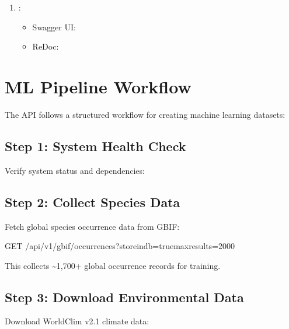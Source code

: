 \documentclass[letterpaper,10pt,english]{sphinxmanual}
\begin{document}
\begin{enumerate}
\item {} 
\sphinxAtStartPar
{}:
\begin{itemize}
\item {} 
\sphinxAtStartPar
Swagger UI: 

\item {} 
\sphinxAtStartPar
ReDoc: 

\end{itemize}

\end{enumerate}


\section{ML Pipeline Workflow}
\label{\detokenize{user_guide:ml-pipeline-workflow}}
\sphinxAtStartPar
The API follows a structured workflow for creating machine learning datasets:


\subsection{Step 1: System Health Check}
\label{\detokenize{user_guide:step-1-system-health-check}}
\sphinxAtStartPar
Verify system status and dependencies:

\begin{sphinxVerbatim}[commandchars=\\\{\}]
 
\end{sphinxVerbatim}


\subsection{Step 2: Collect Species Data}
\label{\detokenize{user_guide:step-2-collect-species-data}}
\sphinxAtStartPar
Fetch global species occurrence data from GBIF:

\begin{sphinxVerbatim}[commandchars=\\\{\}]
GET /api/v1/gbif/occurrences?store\PYGZus{}in\PYGZus{}db=true\PYGZam{}max\PYGZus{}results=2000
\end{sphinxVerbatim}

\sphinxAtStartPar
This collects \textasciitilde{}1,700+ global occurrence records for training.


\subsection{Step 3: Download Environmental Data}
\label{\detokenize{user_guide:step-3-download-environmental-data}}
\sphinxAtStartPar
Download WorldClim v2.1 climate data:
\end{document}

